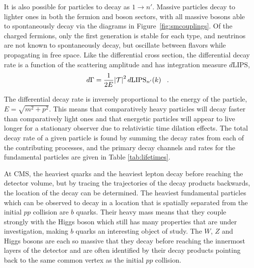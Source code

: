 
 It is also possible for particles to decay
  as $1\rightarrow n'$.
 Massive particles decay to lighter ones
  in both the fermion and boson sectors,
  with all massive bosons able to 
  spontaneously decay via the diagrams in
  Figure~\ref{fig:smcouplings}.
 Of the charged fermions, only the first
  generation is stable for each type, and
  neutrinos are not known to spontaneously
  decay, but oscillate between flavors
  while propagating in free space.
 Like the differential cross section,
  the differential decay rate is a function
  of the scattering amplitude and
  has integration measure $d\mathrm{LIPS}$, 
\begin{equation}\label{eq:diffdecayrate}
 d\Gamma = \frac{1}{2E}\abs{\mathcal{T}}^2d\mathrm{LIPS}_{n'}(k)\;\;\;.
\end{equation}

 The differential decay rate is 
  inversely proportional to the energy
  of the particle, $E=\sqrt{m^2 + p^2}$.
 This means that
  comparatively heavy particles will decay
  faster than comparatively light ones
  and that energetic particles
  will appear to live longer 
  for a stationary observer due to
  relativistic time dilation effects.
 The total decay rate of a given particle
  is found by summing the decay rates from
  each of the contributing processes,
  and the primary decay channels and rates
  for the fundamental particles
  are given in Table \ref{tab:lifetimes}.

 At CMS, the heaviest quarks and the heaviest
  lepton decay before reaching
  the detector volume,
  but by tracing the trajectories of
  the decay products backwards,
  the location of the decay
  can be determined.
 The heaviest fundamental particles
  which can be observed to decay
  in a location that is spatially 
  separated from the initial  $pp$ 
  collision are $b$ quarks.
 Their heavy mass means that they
  couple strongly with the Higgs boson
  which still has many properties that
  are under investigation, making
  $b$ quarks an interesting object of study.
 The $W$, $Z$ and Higgs bosons are each so 
  massive that they decay before reaching
  the innermost layers of the detector
  and are often identified by their decay products
  pointing back to the same common vertex 
  as the initial $pp$ collision.
 

